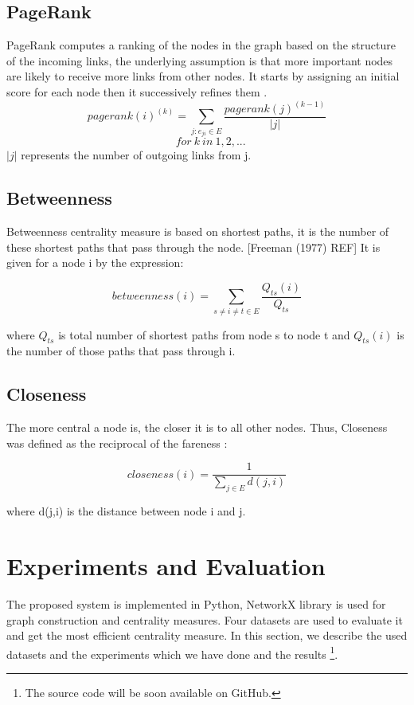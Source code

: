 \documentclass{llncs}
\begin{document}
  \subsection{PageRank}
  PageRank \cite{page_pagerank_1998} computes a ranking of the nodes in the graph  based on the structure of the incoming links, the underlying assumption is that more important nodes are likely to receive more links from other nodes. It starts by assigning an initial score for each node then it successively refines them .
$$pagerank(i)^{(k)}=\sum_{j:e_{ji}\in E} {\frac {pagerank(j)^{(k-1)}} {|j|}}$$ $$ \  \  \  for\ k \ in \ 1,2,...
  $$
  $|j|$ represents the number of outgoing links from j.

  \subsection{Betweenness}
     Betweenness centrality measure \cite{brandes_faster_2001} is based on shortest paths, it is  the number of these shortest paths that pass through the node. [Freeman (1977) REF] It is given for a node i by the expression:

$$betweenness(i)=\sum_{s\neq i\neq t \in E}{\frac  {Q_{ts}(i)} {Q_{ts}}}$$
 
 where $Q_{ts}$ is total number of shortest paths from node s to node t and $Q_{ts}(i)$  is the number of those paths that pass through i.

      \subsection{Closeness}
       The more central a node is, the closer it is to all other nodes.  Thus, Closeness was defined  as the reciprocal of the fareness \cite{freeman_centrality_1978}:
                
          $$closeness(i)=\frac{1}{\sum_{j \in E} {d(j,i)}}$$


       where d(j,i) is the distance between node  i and j.


\section{Experiments and Evaluation}
The proposed system is implemented in Python, NetworkX library is used for  graph construction and centrality measures. Four datasets are used to evaluate it and get the most efficient centrality measure. In this section, we describe the used datasets and the experiments which we have done and the results \footnote{The source code will be soon available on GitHub.}.
\end{document}
